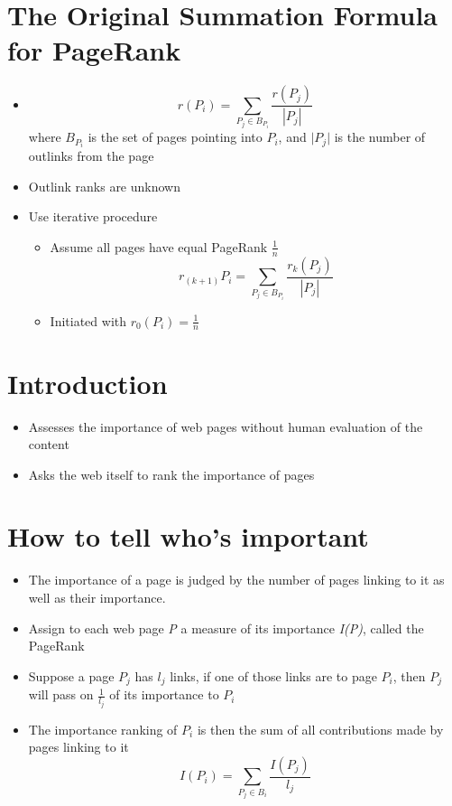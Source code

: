 \documentclass[11pt]{report}
\begin{document}
\section{The Original Summation Formula for PageRank}
\begin{itemize}
\item \begin{equation}
r(P_i) = \displaystyle \sum_{P_j\in B_{P_i }} \frac{r(P_j)}{|P_j|} 
\end{equation} where $B_{P_i }$ is the set of pages pointing into $P_i$, and $\vert P_j \vert $ is the number of outlinks from the page 
\item Outlink ranks are unknown 
\item Use iterative procedure
\begin{itemize}
\item Assume all pages have equal PageRank $\frac{1}{n}$ 
\begin{equation}
r_{(k+1)}P_i = \displaystyle \sum_{P_j\in B_{P_i }}\frac{r_k(P_j)}{|P_j|}
\end{equation}
\item Initiated with \(r_0(P_i) = \frac{1}{n}\)
\end{itemize}
\end{itemize}
\section{Introduction}
\begin{itemize}
\item Assesses the importance of web pages without human evaluation of the content
\item Asks the web itself to rank the importance of pages
\end{itemize}
\section{How to tell who's important}
\begin{itemize}
\item The importance of a page is judged by the number of pages linking to it as well as their importance.
\item Assign to each web page \textit{P} a measure of its importance \textit{I(P)}, called the PageRank
\item Suppose a page $P_j$ has $l_j$ links, if one of those links are to page $P_i$, then $P_j$ will pass on $\frac{1}{l_j}$ of its importance to $P_i$
\item The importance ranking of $P_i$ is then the sum of all contributions made by pages linking to it
\begin{equation}
I(P_i) = \displaystyle \sum_{P_j\in B_{i}} \frac{I(P_j)}{l_j}
\end{equation}
\end{itemize}
\end{document}
